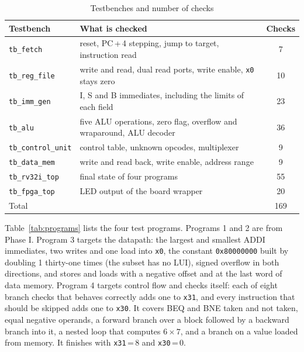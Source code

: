 \documentclass[conference]{IEEEtran}
\begin{document}
\begin{table}[!htb]
\caption{Testbenches and number of checks}
\label{tab:tests}
\centering
\begin{tabular}{@{}l>{\raggedright\arraybackslash}p{4.3cm}c@{}}
\toprule
Testbench & What is checked & Checks \\
\midrule
\texttt{tb\_fetch}   & reset, PC\,+\,4 stepping, jump to target, instruction read & 7 \\
\texttt{tb\_reg\_file} & write and read, dual read ports, write enable, \texttt{x0} stays zero & 10 \\
\texttt{tb\_imm\_gen} & I, S and B immediates, including the limits of each field & 23 \\
\texttt{tb\_alu}     & five ALU operations, zero flag, overflow and wraparound, ALU decoder & 36 \\
\texttt{tb\_control\_unit} & control table, unknown opcodes, multiplexer & 9 \\
\texttt{tb\_data\_mem} & write and read back, write enable, address range & 9 \\
\texttt{tb\_rv32i\_top} & final state of four programs & 55 \\
\texttt{tb\_fpga\_top} & LED output of the board wrapper & 20 \\
\midrule
Total & & 169 \\
\bottomrule
\end{tabular}
\end{table}

Table~\ref{tab:programs} lists the four test programs. Programs 1 and 2 are
from Phase I. Program 3 targets the datapath: the largest and smallest ADDI
immediates, two writes and one load into \texttt{x0}, the constant
\texttt{0x80000000} built by doubling 1 thirty-one times (the subset has no
LUI), signed overflow in both directions, and stores and loads with a
negative offset and at the last word of data memory. Program 4 targets
control flow and checks itself: each of eight branch checks that behaves
correctly adds one to \texttt{x31}, and every instruction that should be
skipped adds one to \texttt{x30}. It covers BEQ and BNE taken and not taken,
equal negative operands, a forward branch over a block followed by a backward
branch into it, a nested loop that computes $6 \times 7$, and a branch on a
value loaded from memory. It finishes with \texttt{x31}\,=\,8 and
\texttt{x30}\,=\,0.
\end{document}
